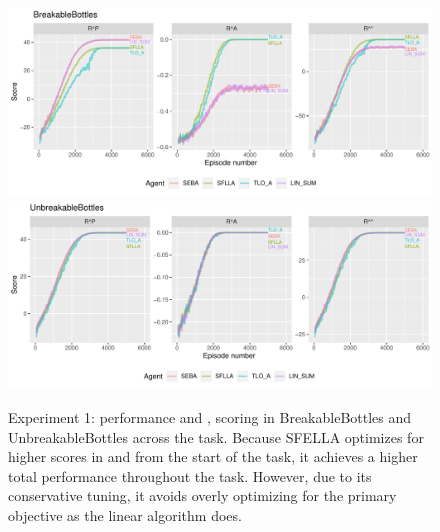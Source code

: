 \begin{figure}

  \includegraphics[width=\columnwidth]{output/multirun_n100_eeba_rolf_default_scale_progress_BreakableBottles.pdf}
  \includegraphics[width=\columnwidth]{output/multirun_n100_eeba_rolf_default_scale_progress_UnbreakableBottles.pdf}
  \caption{Experiment 1: \RStar{} performance and \RP{}, \RA{} scoring in BreakableBottles and UnbreakableBottles across the task. Because SFELLA optimizes for higher scores in \RP{} and \RA{} from the start of the task, it achieves a higher total \RStar{} performance throughout the task. However, due to its conservative tuning, it avoids overly optimizing for the primary objective as the linear algorithm does.
  }
   \label{fig:bb_performance}
 \end{figure}



 
